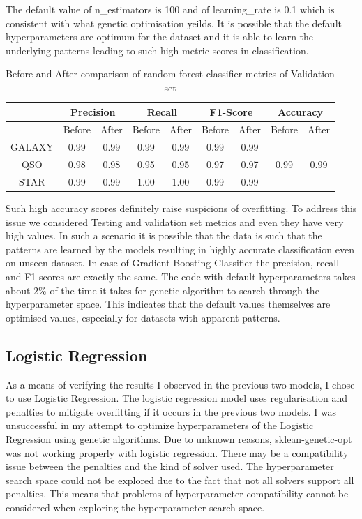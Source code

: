 The default value of n\_estimators is 100 and of learning\_rate is 0.1 which is consistent with what genetic optimisation yeilds. It is possible that the default hyperparameters are optimum for the dataset and it is able to learn the underlying patterns leading to such high metric scores in classification.

\begin{table}[H]
\centering
\caption{Before and After comparison of random forest classifier metrics of Validation set}
\label{tab:GBCCompare}
\begin{tabular}{|c|cc|cc|cc|cc|}
\hline
& \multicolumn{2}{c|}{Precision} & \multicolumn{2}{c|}{Recall} & \multicolumn{2}{c|}{F1-Score} & \multicolumn{2}{c|}{Accuracy}\\
\hline
& Before & After & Before & After & Before & After & Before & After\\
\hline
GALAXY & 0.99 & 0.99 & 0.99 & 0.99 & 0.99 & 0.99 & &\\
QSO    & 0.98 & 0.98 & 0.95 & 0.95 & 0.97 & 0.97 & 0.99 & 0.99\\
STAR   & 0.99 & 0.99 & 1.00 & 1.00 & 0.99 & 0.99 & & \\
\hline
\end{tabular}
\end{table}

Such high accuracy scores definitely raise suspicions of overfitting. To address this issue we considered Testing and validation set metrics and even they have very high values. In such a scenario it is possible that the data is such that the patterns are learned by the models resulting in highly accurate classification even on unseen dataset. In case of Gradient Boosting Classifier the precision, recall and F1 scores are exactly the same. The code with default hyperparameters takes about 2\% of the time it takes for genetic algorithm to search through the hyperparameter space. This indicates that the default values themselves are optimised values, especially for datasets with apparent patterns.

\subsection{Logistic Regression}
As a means of verifying the results I observed in the previous two models, I chose to use Logistic Regression. The logistic regression model uses regularisation and penalties to mitigate overfitting if it occurs in the previous two models. I was unsuccessful in my attempt to optimize hyperparameters of the Logistic Regression using genetic algorithms. Due to unknown reasons, sklean-genetic-opt was not working properly with logistic regression. There may be a compatibility issue between the penalties and the kind of solver used. The hyperparameter search space could not be explored due to the fact that not all solvers support all penalties. This means that problems of hyperparameter compatibility cannot be considered when exploring the hyperparameter search space.

